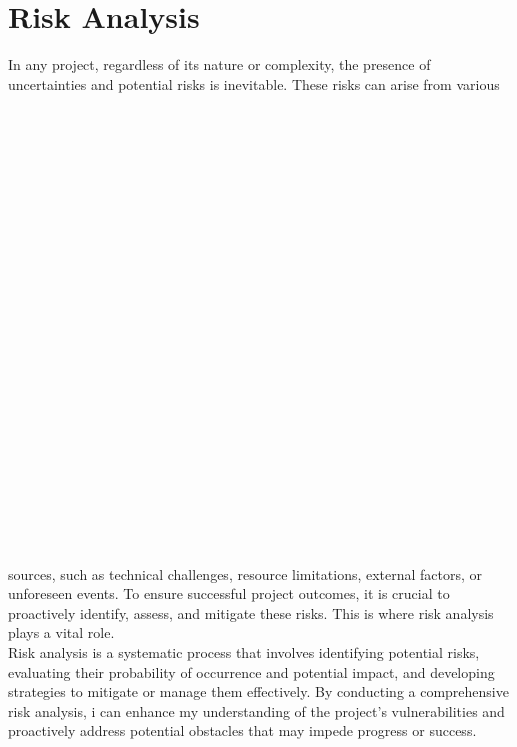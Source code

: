 \documentclass[eng]{class}
\begin{document}
\section{Risk Analysis}
In any project, regardless of its nature or complexity, the presence of uncertainties and potential risks is inevitable.
These risks can arise from various
\\
\\
\\
\\
\\
\\
\\
\\
\\
\\
\\
\\
\\
\\
\\
\\
\\
\\
\\
\\
\\
\\
\\
\\
\\
sources, such as technical challenges, resource limitations, external factors, or unforeseen events.
To ensure successful project outcomes, it is crucial to proactively identify, assess, and mitigate these risks. This is where risk analysis plays a vital role.\\
Risk analysis is a systematic process that involves identifying potential risks, evaluating their probability of occurrence and potential impact,
and developing strategies to mitigate or manage them effectively. By conducting a comprehensive risk analysis,
i can enhance my understanding of the project's vulnerabilities and proactively address potential obstacles that may impede progress or success.\\
\end{document}
